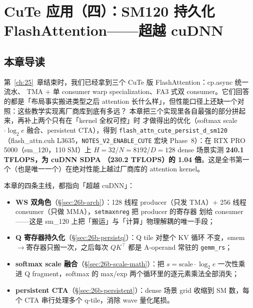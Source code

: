 \chapter{CuTe 应用（四）：SM120 持久化 FlashAttention——超越 cuDNN}\label{ch:26b}

\section{本章导读}

第~\ref{ch:25}~章结束时，我们已经拿到三个 CuTe 版 FlashAttention：cp.async 统一流水、
TMA + 单 consumer warp specialization、FA3 式双 consumer。它们回答的都是「布局事实搬进类型之后
attention 长什么样」，但性能口径上还缺一个对照：这些教学实现离厂商库到底有多远？
本章把三个实现里各自最强的部分拼起来，再补上两个只有在「kernel 全权可控」时
才做得出的优化（softmax scale$\cdot\log_2 e$ 融合、persistent CTA），得到
\texttt{flash\_\allowbreak{}attn\_\allowbreak{}cute\_\allowbreak{}persist\_\allowbreak{}d\_\allowbreak{}sm120}
（flash\_attn.cuh L3635，\texttt{NOTES\_\allowbreak{}V2\_\allowbreak{}ENABLE\_\allowbreak{}CUTE}
宏块 Phase~8）：在 RTX PRO 5000（sm\_120，110 SM）上
$H{=}32$/$N{=}8192$/$D{=}128$ dense 场景实测 \textbf{240.1 TFLOPS，为 cuDNN SDPA
（230.2 TFLOPS）的 1.04 倍}。这是全书第一个（也是唯一一个）在绝对性能上越过厂商库的
attention kernel。

本章的四条主线，都指向「超越 cuDNN」：

\begin{itemize}[itemsep=1pt,topsep=2pt]
  \item \textbf{WS 双角色}（\S\ref{sec:26b-arch}）：128 线程 producer（只发 TMA）+
        256 线程 consumer（只做 MMA），\texttt{setmaxnreg} 把 producer 的寄存器
        划给 consumer——这是 sm\_120 上把「搬运」与「计算」物理解耦的唯一手段；
  \item \textbf{Q 寄存器持久化}（\S\ref{sec:26b-persistq}）：Q tile 对整个 KV 循环
        不变，smem$\to$寄存器只搬一次，之后每次 $QK^\top$ 都是 A-operand 常驻的
        \texttt{gemm\_rs}；
  \item \textbf{softmax scale 融合}（\S\ref{sec:26b-scale-math}）：把
        $s=\text{scale}\cdot\log_2 e$ 一次性乘进 Q fragment，softmax 的 max/exp
        两个循环里的逐元素乘法全部消失；
  \item \textbf{persistent CTA}（\S\ref{sec:26b-persistent}）：dense 场景 grid
        收缩到 SM 数，每个 CTA 串行处理多个 q-tile，消除 wave 量化尾损。
\end{itemize}

